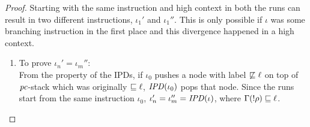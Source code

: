 \begin{proof}
  Starting with the same instruction and high context in both the runs
  can result in two different instructions, $\iota_1'$ and
  $\iota_1''$. This is only possible if $\iota$ was some branching
  instruction in the first place and this divergence happened in a
  high context. 
  \begin{enumerate}
  \item To prove $\iota_n' = \iota_m''$: \\
    From the property of the IPDs, 
    if $\iota_0$ pushes a node with label
    $\not\sqsubseteq \ell$ on top of $\mathit{pc}$-stack
    which was originally $\sqsubseteq \ell$, $\mathit{IPD}(\iota_0)$ pops
    that node. Since the runs start from the same instruction $\iota_0$,
    $\iota_n' = \iota_m'' = \mathit{IPD}(\iota)$, where $\Gamma(!\rho)
    \sqsubseteq \ell$.  
  

\end{enumerate}
\end{proof}
